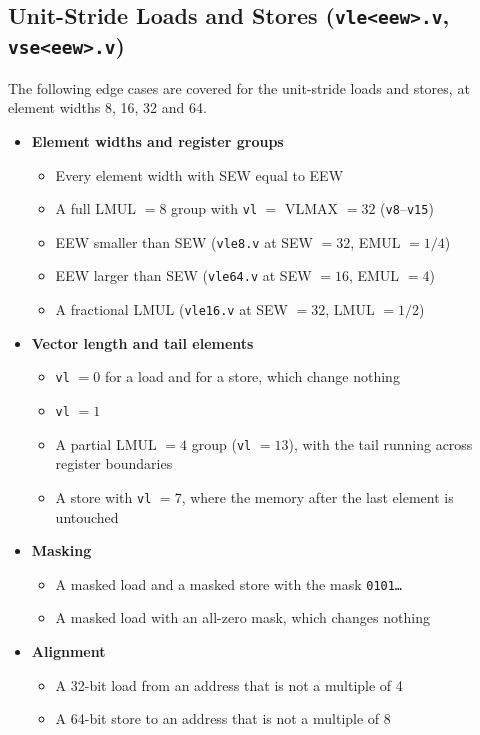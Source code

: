 \documentclass[11pt,a4paper]{article}
\begin{document}
\subsection*{Unit-Stride Loads and Stores (\texttt{vle<eew>.v}, \texttt{vse<eew>.v})}
\label{subsec:ldst-unit}

The following edge cases are covered for the unit-stride loads and stores, at element widths
8, 16, 32 and 64.

\begin{itemize}
    \item \textbf{Element widths and register groups}
    \begin{itemize}
        \item Every element width with SEW equal to EEW
        \item A full LMUL $= 8$ group with \texttt{vl} $=$ VLMAX $= 32$ (\texttt{v8}--\texttt{v15})
        \item EEW smaller than SEW (\texttt{vle8.v} at SEW $= 32$, EMUL $= 1/4$)
        \item EEW larger than SEW (\texttt{vle64.v} at SEW $= 16$, EMUL $= 4$)
        \item A fractional LMUL (\texttt{vle16.v} at SEW $= 32$, LMUL $= 1/2$)
    \end{itemize}

    \item \textbf{Vector length and tail elements}
    \begin{itemize}
        \item \texttt{vl} $= 0$ for a load and for a store, which change nothing
        \item \texttt{vl} $= 1$
        \item A partial LMUL $= 4$ group (\texttt{vl} $= 13$), with the tail running across
              register boundaries
        \item A store with \texttt{vl} $= 7$, where the memory after the last element is untouched
    \end{itemize}

    \item \textbf{Masking}
    \begin{itemize}
        \item A masked load and a masked store with the mask \texttt{0101\ldots}
        \item A masked load with an all-zero mask, which changes nothing
    \end{itemize}

    \item \textbf{Alignment}
    \begin{itemize}
        \item A 32-bit load from an address that is not a multiple of 4
        \item A 64-bit store to an address that is not a multiple of 8
    \end{itemize}


\end{itemize}
\end{document}
